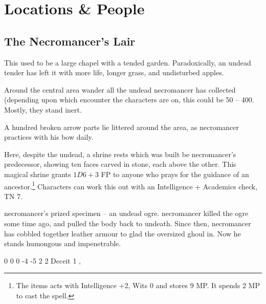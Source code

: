 \section{Locations \& People}

\begin{multicols}{2}

\setcounter{list}{0}

\subsection{The Necromancer's Lair}\label{necromancers_lair}
This used to be a large chapel with a tended garden.  Paradoxically, an undead tender has left it with more life, longer grass, and undisturbed apples.

\begin{figure*}[t]



\end{figure*}


Around the central area wander all the undead \gls{necromancer} has collected (depending upon which encounter the characters are on, this could be 50 -- 400.  Mostly, they stand inert.

A hundred broken arrow parts lie littered around the area, as \gls{necromancer} practices with his bow daily.



Here, despite the undead, a shrine rests which was built be \gls{necromancer}'s predecessor, showing ten faces carved in stone, each above the other.  This magical shrine grants $1D6 + 3$ FP to anyone who prays for the guidance of an ancestor.\footnote{The items acts with Intelligence +2, Wits 0 and stores 9 MP. It spends 2 MP to cast the spell.}  Characters can work this out with an Intelligence + Academics check, TN 7.


\Gls{necromancer}'s prized specimen -- an undead ogre.
\Gls{necromancer} killed the ogre some time ago, and pulled the body back to undeath.
Since then, \gls{necromancer} has cobbled together leather armour to glad the oversized ghoul in.
Now he stands humongous and impenetrable.


{0}%
{0}%
{{0}%
{-4}%
{-5}}%
{2}%
{2}%
{Deceit 1}%
{\greatclub, \completeleather}%
{}%


\end{multicols}
